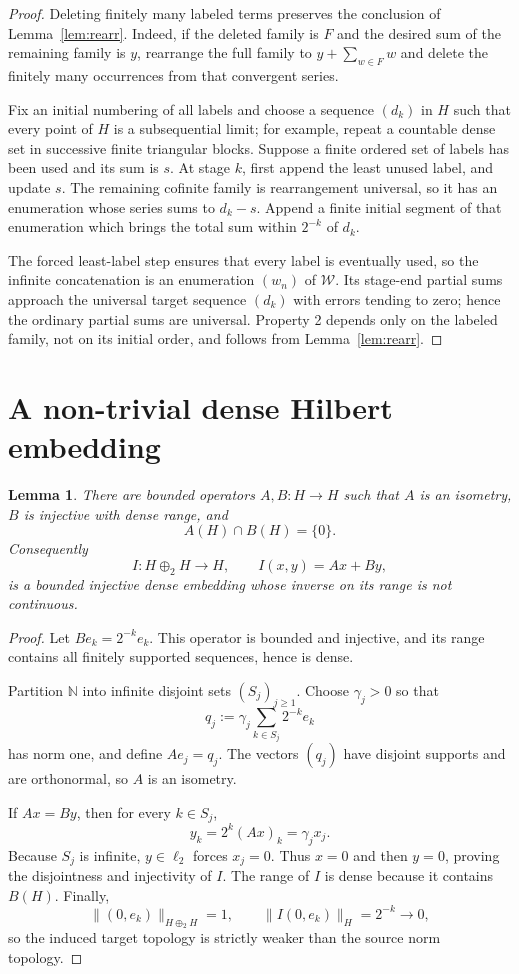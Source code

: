 \documentclass[11pt]{article}
\newtheorem{lemma}[theorem]{Lemma}
\newcommand{\N}{\mathbb N}
\newcommand{\cW}{\mathcal W}
\begin{document}
\begin{proof}
Deleting finitely many labeled terms preserves the conclusion of
Lemma~\ref{lem:rearr}.  Indeed, if the deleted family is $F$ and the desired
sum of the remaining family is $y$, rearrange the full family to
$y+\sum_{w\in F}w$ and delete the finitely many occurrences from that
convergent series.

Fix an initial numbering of all labels and choose a sequence $(d_k)$ in $H$
such that every point of $H$ is a subsequential limit; for example, repeat a
countable dense set in successive finite triangular blocks.  Suppose a finite
ordered set of labels has been used and its sum is $s$.  At stage $k$, first
append the least unused label, and update $s$.  The remaining cofinite family
is rearrangement universal, so it has an enumeration whose series sums to
$d_k-s$.  Append a finite initial segment of that enumeration which brings
the total sum within $2^{-k}$ of $d_k$.

The forced least-label step ensures that every label is eventually used, so
the infinite concatenation is an enumeration $(w_n)$ of $\cW$.  Its stage-end
partial sums approach the universal target sequence $(d_k)$ with errors
tending to zero; hence the ordinary partial sums are universal.  Property 2
depends only on the labeled family, not on its initial order, and follows from
Lemma~\ref{lem:rearr}.
\end{proof}

\section{A non-trivial dense Hilbert embedding}

\begin{lemma}\label{lem:embed}
There are bounded operators $A,B:H\to H$ such that $A$ is an isometry, $B$ is
injective with dense range, and
\[
  A(H)\cap B(H)=\{0\}.
\]
Consequently
\[
  I:H\oplus_2H\longrightarrow H,\qquad I(x,y)=Ax+By,
\]
is a bounded injective dense embedding whose inverse on its range is not
continuous.
\end{lemma}

\begin{proof}
Let $Be_k=2^{-k}e_k$.  This operator is bounded and injective, and its range
contains all finitely supported sequences, hence is dense.

Partition $\N$ into infinite disjoint sets $(S_j)_{j\geq1}$.  Choose
$\gamma_j>0$ so that
\[
  q_j:=\gamma_j\sum_{k\in S_j}2^{-k}e_k
\]
has norm one, and define $Ae_j=q_j$.  The vectors $(q_j)$ have disjoint
supports and are orthonormal, so $A$ is an isometry.

If $Ax=By$, then for every $k\in S_j$,
\[
  y_k=2^k(Ax)_k=\gamma_jx_j.
\]
Because $S_j$ is infinite, $y\in\ell_2$ forces $x_j=0$.  Thus $x=0$ and then
$y=0$, proving the disjointness and injectivity of $I$.  The range of $I$ is
dense because it contains $B(H)$.  Finally,
\[
  \|(0,e_k)\|_{H\oplus_2H}=1,
  \qquad
  \|I(0,e_k)\|_H=2^{-k}\longrightarrow0,
\]
so the induced target topology is strictly weaker than the source norm
topology.
\end{proof}
\end{document}

